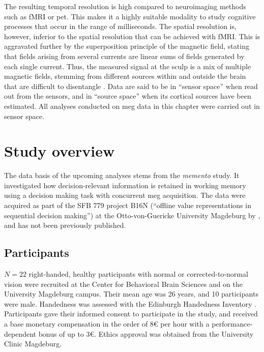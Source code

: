 The resulting temporal resolution is high compared to neuroimaging methods such as \gls{fMRI} or \gls{pet}.
This makes it a highly suitable modality to study cognitive processes that occur in the range of milliseconds.
The spatial resolution is, however, inferior to the spatial resolution that can be achieved with \gls{fMRI}.
This is aggravated further by the superposition principle of the magnetic field, stating that fields arising from several currents are linear sums of fields generated by each single current.
Thus, the measured signal at the sculp is a mix of multiple magnetic fields, stemming from different sources within and outside the brain that are difficult to disentangle \citep{hari2017primer}.
Data are said to be in ``sensor space'' when read out from the sensors, and in ``source space'' when its cortical sources have been estimated.
All analyses conducted on \gls{meg} data in this chapter were carried out in sensor space.



\section{Study overview}


The data basis of the upcoming analyses stems from the \textit{memento} study.
It investigated how decision-relevant information is retained in working memory using a decision making task with concurrent \gls{meg} acquisition.
The data were acquired as part of the SFB 779 project B16N (``offline value representations in sequential decision making'') at the Otto-von-Guericke University Magdeburg by \citet{kaiser}, and has not been previously published.


\subsection{Participants}

$N = 22$ right-handed, healthy participants with normal or corrected-to-normal vision were recruited at the Center for Behavioral Brain Sciences and on the University Magdeburg campus.
Their mean age was 26 years, and 10 participants were male.
Handedness was assessed with the Edinburgh Handedness Inventory \citep{oldfield1971assessment}.
Participants gave their informed consent to participate in the study, and received a base monetary compensation in the order of 8€ per hour with a performance-dependent bonus of up to 3€.
Ethics approval was obtained from the University Clinic Magdeburg.

